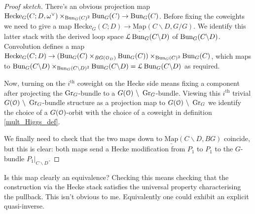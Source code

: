 \documentclass[10pt, oneside]{article}
\newcommand{\hecke}{\mathrm{Hecke}}
\newcommand{\map}{\underline{\mathrm{Map}}}
\begin{document}
\begin{proof}[Proof sketch]
There's an obvious projection map $\hecke_G(C;D,\omega^\vee) \times_{\bun_G(C)^2} \bun_G(C) \to \bun_G(C)$.  Before fixing the coweights we need to give a map $\hecke_G(C;D) \to \map(C\backslash D, G/G)$.  We identify this latter stack with the derived loop space $\mathcal{L}\operatorname{Bun}_G(C\backslash D)$ of $\operatorname{Bun}_G(C\backslash D)$.  Convolution defines a map $\hecke_G(C;D) \to (\bun_G(C) \times_{BG(\OO_D)} \bun_G(C)) \times_{\bun_G(C)^2} \bun_G(C)$, which maps to $\operatorname{Bun}_G(C\backslash D) \times_{\operatorname{Bun}_G(C\backslash D)^2} \operatorname{Bun}_G(C\backslash D) = \mathcal{L}\operatorname{Bun}_G(C\backslash D)$ as required.

Now, turning on the $i^{\text{th}}$ coweight on the Hecke side means fixing a component after projecting the $\operatorname{Gr}_G$-bundle to a $G(\mathcal{O}) \ \backslash \  \operatorname{Gr}_G$-bundle.  Viewing this $i^{\text{th}}$ trivial $G(\mathcal{O}) \ \backslash \  \operatorname{Gr}_G$-bundle structure as a projection map to $G(\mathcal{O}) \ \backslash \  \operatorname{Gr}_G$ we identify the choice of a $G(\mathcal{O})$-orbit with the choice of a coweight in definition \ref{mult_Higgs_def}.

We finally need to check that the two maps down to $\map(C\backslash D, BG)$ coincide, but this is clear: both maps send a Hecke modification from $P_1$ to $P_1$ to the $G$-bundle $P_1|_{C\backslash D}$.
\end{proof}

\begin{question}
Is this map clearly an equivalence?  Checking this means checking that the construction via the Hecke stack satisfies the universal property characterising the pullback.  This isn't obvious to me.  Equivalently one could exhibit an explicit quasi-inverse.
\end{question}
\end{document}
